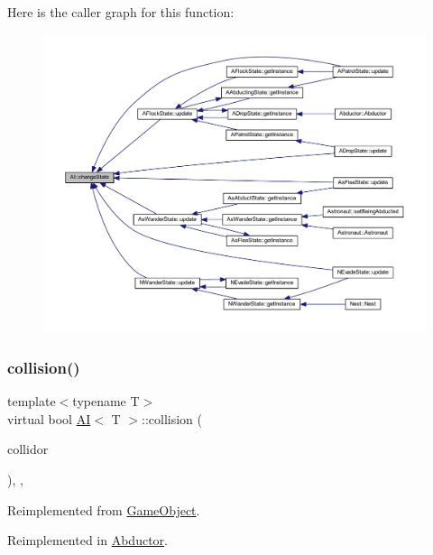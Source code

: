 Here is the caller graph for this function\+:
\nopagebreak
\begin{figure}[H]
\begin{center}
\leavevmode
\includegraphics[width=350pt]{class_a_i_ae08cb2117d4352ad462fefa357028a82_icgraph}
\end{center}
\end{figure}
\mbox{\label{class_a_i_a15f7ffd56bf48c7475f9b50d82b60528}} 
\subsubsection{\texorpdfstring{collision()}{collision()}}
{\footnotesize\ttfamily template$<$typename T$>$ \\
virtual bool \hyperlink{class_a_i}{AI}$<$ T $>$\+::collision (\begin{DoxyParamCaption}\item[{const std\+::shared\+\_\+ptr$<$ \hyperlink{class_game_object}{Game\+Object} $>$ \&}]{collidor }\end{DoxyParamCaption})\hspace{0.3cm}{\ttfamily [inline]}, {\ttfamily [override]}, {\ttfamily [virtual]}}



Reimplemented from \hyperlink{class_game_object_a56a330813f51b91b2ad8aacb42b6d8ea}{Game\+Object}.



Reimplemented in \hyperlink{class_abductor_a247dff8e49fc656700c8cb16ed08252d}{Abductor}.

